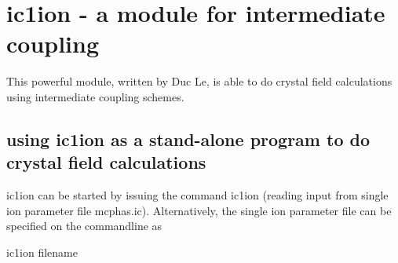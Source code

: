 \section{{\prg ic1ion} - a module for intermediate coupling}\label{ic1ion}


This powerful module, written by Duc Le, is able to do crystal field calculations
using intermediate coupling schemes. 

\subsection{using {\prg ic1ion} as a stand-alone program to do crystal field calculations}

{\prg ic1ion} can be started by issuing the command {\prg ic1ion} (reading input from single ion %
parameter file {\prg mcphas.ic}). Alternatively, the single ion parameter file can be specified on the commandline as

{\prg ic1ion filename}


